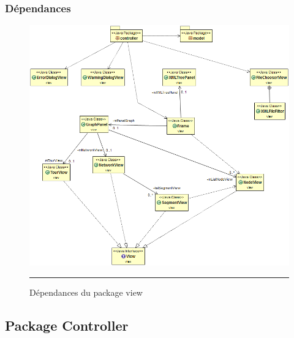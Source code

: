 \subsubsection{Dépendances}

\begin{figure}[H]
	\centering
		\includegraphics[width=\textwidth,height=\textheight,keepaspectratio]{Figures/retro_view_dep}
		\rule{35em}{0.5pt}
	\caption[Dépendances du package view]{Dépendances du package view}
\end{figure}


\subsection{Package Controller}
